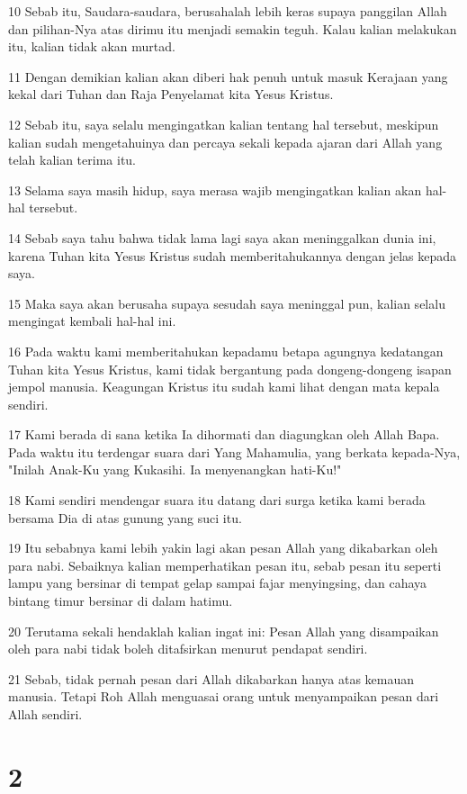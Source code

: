 \par 10 Sebab itu, Saudara-saudara, berusahalah lebih keras supaya panggilan Allah dan pilihan-Nya atas dirimu itu menjadi semakin teguh. Kalau kalian melakukan itu, kalian tidak akan murtad.
\par 11 Dengan demikian kalian akan diberi hak penuh untuk masuk Kerajaan yang kekal dari Tuhan dan Raja Penyelamat kita Yesus Kristus.
\par 12 Sebab itu, saya selalu mengingatkan kalian tentang hal tersebut, meskipun kalian sudah mengetahuinya dan percaya sekali kepada ajaran dari Allah yang telah kalian terima itu.
\par 13 Selama saya masih hidup, saya merasa wajib mengingatkan kalian akan hal-hal tersebut.
\par 14 Sebab saya tahu bahwa tidak lama lagi saya akan meninggalkan dunia ini, karena Tuhan kita Yesus Kristus sudah memberitahukannya dengan jelas kepada saya.
\par 15 Maka saya akan berusaha supaya sesudah saya meninggal pun, kalian selalu mengingat kembali hal-hal ini.
\par 16 Pada waktu kami memberitahukan kepadamu betapa agungnya kedatangan Tuhan kita Yesus Kristus, kami tidak bergantung pada dongeng-dongeng isapan jempol manusia. Keagungan Kristus itu sudah kami lihat dengan mata kepala sendiri.
\par 17 Kami berada di sana ketika Ia dihormati dan diagungkan oleh Allah Bapa. Pada waktu itu terdengar suara dari Yang Mahamulia, yang berkata kepada-Nya, "Inilah Anak-Ku yang Kukasihi. Ia menyenangkan hati-Ku!"
\par 18 Kami sendiri mendengar suara itu datang dari surga ketika kami berada bersama Dia di atas gunung yang suci itu.
\par 19 Itu sebabnya kami lebih yakin lagi akan pesan Allah yang dikabarkan oleh para nabi. Sebaiknya kalian memperhatikan pesan itu, sebab pesan itu seperti lampu yang bersinar di tempat gelap sampai fajar menyingsing, dan cahaya bintang timur bersinar di dalam hatimu.
\par 20 Terutama sekali hendaklah kalian ingat ini: Pesan Allah yang disampaikan oleh para nabi tidak boleh ditafsirkan menurut pendapat sendiri.
\par 21 Sebab, tidak pernah pesan dari Allah dikabarkan hanya atas kemauan manusia. Tetapi Roh Allah menguasai orang untuk menyampaikan pesan dari Allah sendiri.

\chapter{2}

